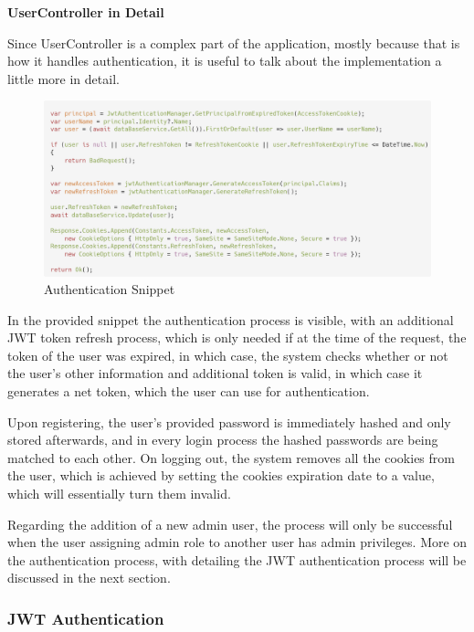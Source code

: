 \newpage

\noindent\textbf{UserController in Detail}

Since UserController is a complex part of the application, mostly because that is how it handles authentication, it is useful to talk about the implementation a little more in detail.

\begin{figure}[H]
	\centering
	\includegraphics[width=1\linewidth]{img/code_auth.png}
	\caption{Authentication Snippet}
	\label{fig:authcode}
\end{figure}

In the provided snippet the authentication process is visible, with an additional JWT token refresh process, which is only needed if at the time of the request, the token of the user was expired, in which case, the system checks whether or not the user's other information and additional token is valid, in which case it generates a net token, which the user can use for authentication.

Upon registering, the user's provided password is immediately hashed and only stored afterwards, and in every login process the hashed passwords are being matched to each other.
On logging out, the system removes all the cookies from the user, which is achieved by setting the cookies expiration date to a value, which will essentially turn them invalid.

Regarding the addition of a new admin user, the process will only be successful when the user assigning admin role to another user has admin privileges. More on the authentication process, with detailing the JWT authentication process will be discussed in the next section.

\subsubsection{JWT Authentication}

